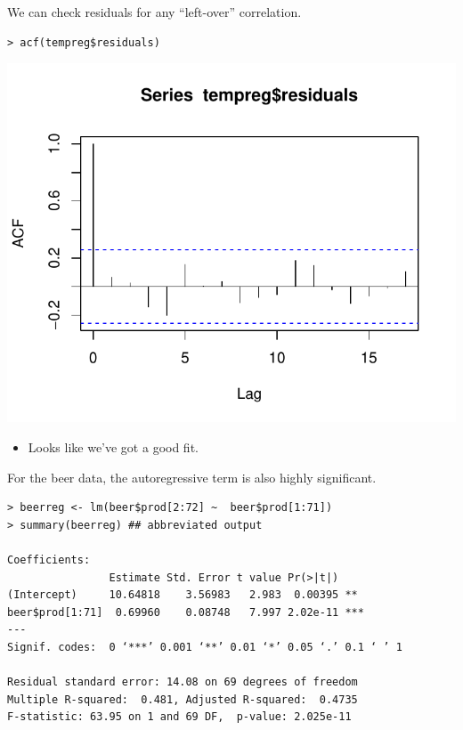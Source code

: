 \documentclass[12pt,xcolor=svgnames]{beamer}
\newcommand{\bl}{\color{blue}}
\newcommand{\nochap}{\vspace{0.5cm}}
\begin{document}
\begin{frame}[fragile]
\nochap

We can check residuals for any ``left-over'' correlation.

{\bl
\begin{verbatim}
> acf(tempreg$residuals)
\end{verbatim}
}

\begin{center} 
\begin{minipage}{7.5cm}
\includegraphics[scale=0.68,trim=15 25 0 20]{acftempreg_new}
\end{minipage}
\begin{minipage}{3cm}
\begin{itemize}
\item Looks like we've got a good fit.
\end{itemize}
\end{minipage}
\end{center}

\end{frame}


\begin{frame}[fragile]
\nochap

For the beer data, the autoregressive term is also highly significant.

{\bl \footnotesize
\begin{verbatim}
> beerreg <- lm(beer$prod[2:72] ~  beer$prod[1:71])
> summary(beerreg) ## abbreviated output

Coefficients:
                Estimate Std. Error t value Pr(>|t|)    
(Intercept)     10.64818    3.56983   2.983  0.00395 ** 
beer$prod[1:71]  0.69960    0.08748   7.997 2.02e-11 ***
---
Signif. codes:  0 ‘***’ 0.001 ‘**’ 0.01 ‘*’ 0.05 ‘.’ 0.1 ‘ ’ 1

Residual standard error: 14.08 on 69 degrees of freedom
Multiple R-squared:  0.481, Adjusted R-squared:  0.4735 
F-statistic: 63.95 on 1 and 69 DF,  p-value: 2.025e-11
\end{verbatim}
}

\end{frame}
\end{document}
